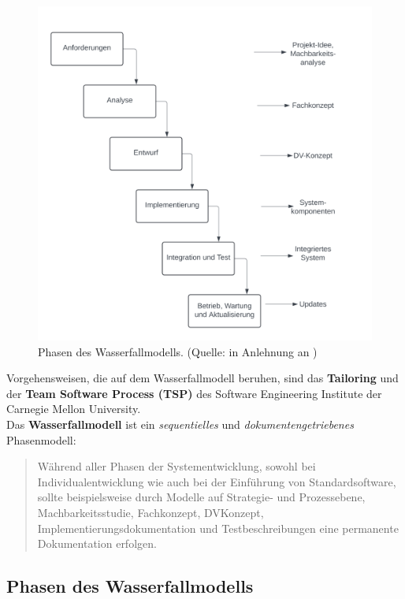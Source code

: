 \begin{figure}
    \centering
    \includegraphics[scale=0.3]{chapters/Uebersicht ueber die Phasen des Entwicklungszyklus/img/wasserfallmodell}
    \caption{Phasen des Wasserfallmodells. (Quelle: in Anlehnung an \cite[318, Abbildung 14-3]{AABG14n})}
    \label{fig:wasserfallmodell}
\end{figure}


\noindent
Vorgehensweisen, die auf dem Wasserfallmodell beruhen, sind das \textbf{Tailoring} und der \textbf{Team Software Process (TSP)} des Software Engineering Institute der Carnegie Mellon University.\\

\noindent
Das \textbf{Wasserfallmodell} ist ein \textit{sequentielles} und \textit{dokumentengetriebenes} Phasenmodell:

\blockquote[{\cite[319]{AABG14n}}]{
    Während aller Phasen der Systementwicklung, sowohl bei Individualentwicklung
    wie auch bei der Einführung von Standardsoftware, sollte beispielsweise durch
    Modelle auf Strategie- und Prozessebene, Machbarkeitsstudie, Fachkonzept, DVKonzept, Implementierungsdokumentation
    und Testbeschreibungen eine permanente Dokumentation erfolgen.
}

\subsection{Phasen des Wasserfallmodells}


